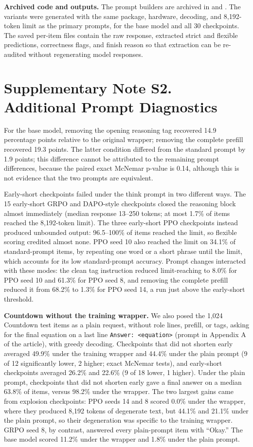 \documentclass[11pt]{article}
\begin{document}
\noindent\textbf{Archived code and outputs.} The prompt builders are archived in  and
. The variants were generated with the same package,
hardware, decoding, and 8,192-token limit as the primary prompts, for the base model and all 30 checkpoints. The saved per-item files contain the raw response, extracted strict and flexible predictions, correctness flags, and finish reason so that extraction can be re-audited without regenerating model responses.

\section*{Supplementary Note S2. Additional Prompt Diagnostics}
For the base model, removing the opening reasoning tag recovered 14.9 percentage points relative to the original wrapper; removing the complete prefill recovered 19.3 points. The latter condition differed from the standard prompt by 1.9 points; this difference cannot be attributed to the remaining prompt differences, because the paired exact McNemar p-value is 0.14, although this is not evidence that the two prompts are equivalent.

Early-short checkpoints failed under the think prompt in two different ways. The 15 early-short GRPO and DAPO-style checkpoints closed the reasoning block almost immediately (median response 13--250 tokens; at most 1.7\% of items reached the 8,192-token limit). The three early-short PPO checkpoints instead produced unbounded output: 96.5--100\% of items reached the limit, so flexible scoring credited almost none. PPO seed 10 also reached the limit on 34.1\% of standard-prompt items, by repeating one word or a short phrase until the limit, which accounts for its low standard-prompt accuracy. Prompt changes interacted with these modes: the clean tag instruction reduced limit-reaching to 8.0\% for PPO seed 10 and 61.3\% for PPO seed 8, and removing the complete prefill reduced it from 68.2\% to 1.3\% for PPO seed 14, a run just above the early-short threshold.

\noindent\textbf{Countdown without the training wrapper.} We also posed the 1,024 Countdown test items as a plain request, without role lines, prefill, or tags, asking for the final equation on a last line \texttt{Answer: <equation>} (prompt in Appendix A of the article), with greedy decoding. Checkpoints that did not shorten early averaged 49.9\% under the training wrapper and 44.4\% under the plain prompt (9 of 12 significantly lower, 2 higher; exact McNemar tests), and early-short checkpoints averaged 26.2\% and 22.6\% (9 of 18 lower, 1 higher). Under the plain prompt, checkpoints that did not shorten early gave a final answer on a median 63.8\% of items, versus 98.2\% under the wrapper. The two largest gains came from explosion checkpoints: PPO seeds 14 and 8 scored 0.0\% under the wrapper, where they produced 8,192 tokens of degenerate text, but 44.1\% and 21.1\% under the plain prompt, so their degeneration was specific to the training wrapper. GRPO seed 8, by contrast, answered every plain-prompt item with ``Okay.'' The base model scored 11.2\% under the wrapper and 1.8\% under the plain prompt.
\end{document}
